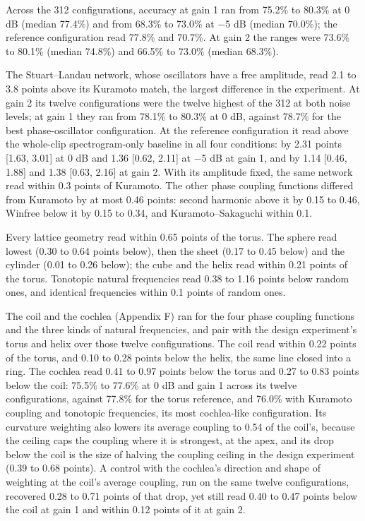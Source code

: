 \documentclass[10pt]{article}
\begin{document}
Across the 312 configurations, accuracy at gain 1 ran from 75.2\% to
80.3\% at 0 dB (median 77.4\%) and from 68.3\% to 73.0\% at
\ensuremath{-}5 dB (median 70.0\%); the reference configuration read
77.8\% and 70.7\%. At gain 2 the ranges were 73.6\% to 80.1\% (median
74.8\%) and 66.5\% to 73.0\% (median 68.3\%).

The Stuart--Landau network, whose oscillators have a free amplitude,
read 2.1 to 3.8 points above its Kuramoto match, the largest difference
in the experiment. At gain 2 its twelve configurations were the twelve
highest of the 312 at both noise levels; at gain 1 they ran from 78.1\%
to 80.3\% at 0 dB, against 78.7\% for the best phase-oscillator
configuration. At the reference configuration it read above the
whole-clip spectrogram-only baseline in all four conditions: by 2.31
points {[}1.63, 3.01{]} at 0 dB and 1.36 {[}0.62, 2.11{]} at
\ensuremath{-}5 dB at gain 1, and by 1.14 {[}0.46, 1.88{]} and 1.38
{[}0.63, 2.16{]} at gain 2. With its amplitude fixed, the same network
read within 0.3 points of Kuramoto. The other phase coupling functions
differed from Kuramoto by at most 0.46 points: second harmonic above it
by 0.15 to 0.46, Winfree below it by 0.15 to 0.34, and
Kuramoto--Sakaguchi within 0.1.

Every lattice geometry read within 0.65 points of the torus. The sphere
read lowest (0.30 to 0.64 points below), then the sheet (0.17 to 0.45
below) and the cylinder (0.01 to 0.26 below); the cube and the helix
read within 0.21 points of the torus. Tonotopic natural frequencies read
0.38 to 1.16 points below random ones, and identical frequencies within
0.1 points of random ones.

The coil and the cochlea (Appendix F) ran for the four phase coupling
functions and the three kinds of natural frequencies, and pair with the
design experiment's torus and helix over those twelve configurations.
The coil read within 0.22 points of the torus, and 0.10 to 0.28 points
below the helix, the same line closed into a ring. The cochlea read 0.41
to 0.97 points below the torus and 0.27 to 0.83 points below the coil:
75.5\% to 77.6\% at 0 dB and gain 1 across its twelve configurations,
against 77.8\% for the torus reference, and 76.0\% with Kuramoto
coupling and tonotopic frequencies, its most cochlea-like configuration.
Its curvature weighting also lowers its average coupling to 0.54 of the
coil's, because the ceiling caps the coupling where it is strongest, at
the apex, and its drop below the coil is the size of halving the
coupling ceiling in the design experiment (0.39 to 0.68 points). A
control with the cochlea's direction and shape of weighting at the
coil's average coupling, run on the same twelve configurations,
recovered 0.28 to 0.71 points of that drop, yet still read 0.40 to 0.47
points below the coil at gain 1 and within 0.12 points of it at gain 2.
\end{document}
